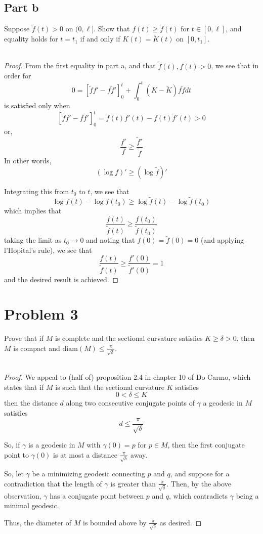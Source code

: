 \documentclass[fontsize=11pt]{scrartcl} %
\numberwithin{equation}{section} %
\numberwithin{figure}{section} %
\numberwithin{table}{section} %
\begin{document}
\subsection*{Part b}
Suppose $\tilde{f}(t)>0$ on $(0,\ell]$. Show that $f(t)\geq \tilde{f}(t)$ for
$t\in [0,\ell]$, and equality holds for $t=t_1$ if and only if
$K(t)=\tilde{K}(t)$ on $[0,t_1]$.
\\
\\
\begin{proof}
    From the first equality in part a, and that $\tilde{f}(t),f(t)>0$, we see
    that in order for
    \[
    0 = [\tilde{f}f' - f\tilde{f}']_0^t +
    \int_0^t(K-\tilde{K})f\tilde{f}dt
    \]
    is satisfied only when
    \[
        [\tilde{f}f' - f\tilde{f}']_0^t = \tilde{f}(t)f'(t) -
        f(t)\tilde{f}'(t) > 0
    \]
    or,
    \[
        \frac{f'}{f}\geq \frac{\tilde{f}'}{\tilde{f}}
    \]
    In other words,
    \[
        (\log f)'\geq (\log \tilde{f})'
    \]

    Integrating this from $t_0$ to $t$, we see that
    \[
        \log f(t) - \log f(t_0)\geq \log \tilde{f}(t) - \log\tilde{f}(t_0)
    \]
    which implies that
    \[
        \frac{f(t)}{\tilde{f}(t)}\geq \frac{f(t_0)}{\tilde{f}(t_0)}
    \]
    taking the limit as $t_0\to 0$ and noting that $f(0)=\tilde{f}(0)=0$ (and
    applying l'Hopital's rule), we see that
    \[
        \frac{f(t)}{\tilde{f}(t)}\geq \frac{f'(0)}{\tilde{f}'(0)} = 1
    \]
    and the desired result is achieved.
\end{proof}

\newpage




\section*{Problem 3}
Prove that if $M$ is complete and the sectional curvature satisfies
$K\geq\delta>0$, then $M$ is compact and $\text{diam}(M)\leq
\frac{\pi}{\sqrt{\delta}}$.
\\
\\
\begin{proof}
    We appeal to (half of) proposition 2.4 in chapter 10 of Do Carmo, which
    states that if $M$ is such that the sectional curvature $K$ satisfies
    \[
        0<\delta\leq K
    \]
    then the distance $d$ along two consecutive conjugate points of $\gamma$ a
    geodesic in $M$ satisfies
    \[
        d\leq \frac{\pi}{\sqrt{\delta}}
    \]
    
    So, if $\gamma$ is a geodesic in $M$ with $\gamma(0)=p$ for $p\in M$, then
    the first conjugate point to $\gamma(0)$ is at most a distance
    $\frac{\pi}{\sqrt{\delta}}$ away. 
    
    So, let $\gamma$ be a minimizing geodesic connecting $p$ and $q$, and
    suppose for a contradiction that the length of $\gamma$ is greater than
    $\frac{\pi}{\sqrt{\delta}}$. Then, by the above observation, $\gamma$ has a
    conjugate point between $p$ and $q$, which contradicts $\gamma$ being a
    minimal geodesic.

    Thus, the diameter of $M$ is bounded above by $\frac{\pi}{\sqrt{\delta}}$ as
    desired.
\end{proof}
\end{document}
